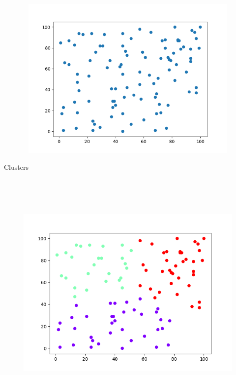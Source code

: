 \documentclass[12pt]{article}
\renewcommand{\_}{\kern-1.5pt\textunderscore\kern-1.5pt}
\begin{document}
\begin{figure}[H]
	\begin{Center}
		\includegraphics[width=6.4in,height=3.15in]{./media/image17.png}
	\end{Center}
\end{figure}



\par

{\fontsize{14pt}{16.8pt} Clusters\par}\par




\begin{figure}[H]
	\begin{Center}
		\includegraphics[width=6.4in,height=4.8in]{./media/image18.png}
	\end{Center}
\end{figure}
\end{document}
